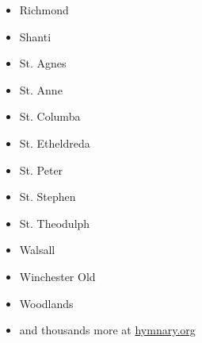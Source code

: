 \begin{itemize}
	\item Richmond
	\item Shanti
	\item St. Agnes
	\item St. Anne
	\item St. Columba
	\item St. Etheldreda
	\item St. Peter
	\item St. Stephen
	\item St. Theodulph
	\item Walsall
	\item Winchester Old
	\item Woodlands
	\item \textup{and thousands more at \href{https://hymnary.org/search?page=3&qu=meter\%3A8.6.8.6\%20in\%3Atunes&sort=totalInstances}{hymnary.org}}
\end{itemize}

